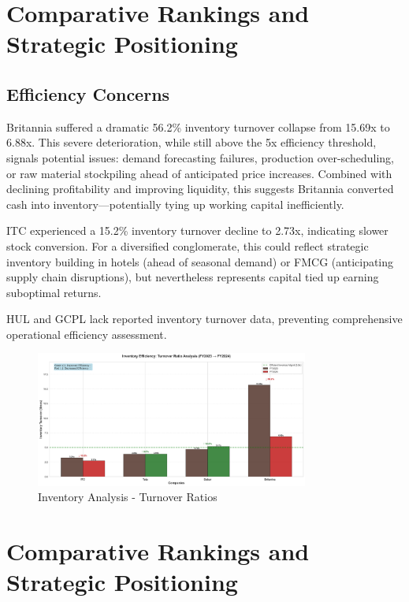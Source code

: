 \documentclass[12pt, a4paper]{report}
\begin{document}
\newpage

\section{Comparative Rankings and Strategic Positioning}

\subsection{Efficiency Concerns}

Britannia suffered a dramatic 56.2\% inventory turnover collapse from 15.69x to 6.88x. This severe deterioration, while still above the 5x efficiency threshold, signals potential issues: demand forecasting failures, production over-scheduling, or raw material stockpiling ahead of anticipated price increases. Combined with declining profitability and improving liquidity, this suggests Britannia converted cash into inventory—potentially tying up working capital inefficiently.

ITC experienced a 15.2\% inventory turnover decline to 2.73x, indicating slower stock conversion. For a diversified conglomerate, this could reflect strategic inventory building in hotels (ahead of seasonal demand) or FMCG (anticipating supply chain disruptions), but nevertheless represents capital tied up earning suboptimal returns.

HUL and GCPL lack reported inventory turnover data, preventing comprehensive operational efficiency assessment.

\begin{figure}[H]
    \centering
    \includegraphics[width=0.8\textwidth]{assets/imperative_analysis/inventory_analysis.png}
    \caption{Inventory Analysis - Turnover Ratios}
\end{figure}

\vspace{0.3cm}

\section{Comparative Rankings and Strategic Positioning}
\end{document}
